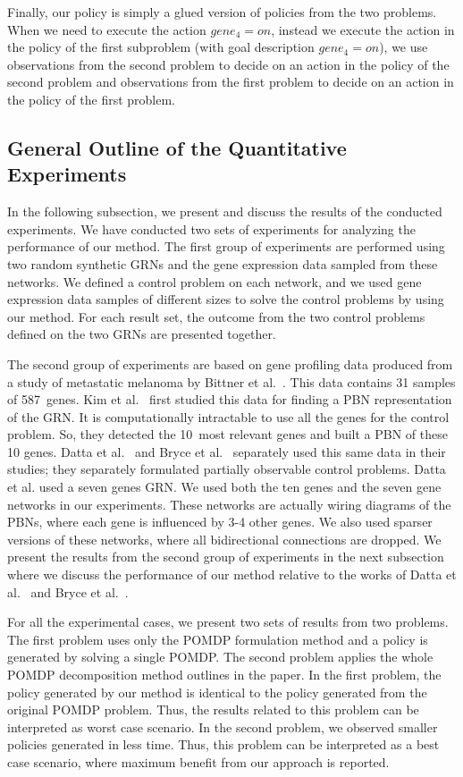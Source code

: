 Finally, our policy is simply a glued version of policies from the two problems. When we need to execute the
action $gene_4 =on$, instead we execute the action in the policy of the first subproblem (with goal
description $gene_4 = on$), we use observations from the second problem to decide on an action in the policy
of the second problem and observations from the first problem to decide on an action in the policy of the
first problem.

\subsection{General Outline of the Quantitative Experiments}
In the following subsection, we present and discuss the results of the conducted experiments. We have conducted two sets
of experiments for analyzing the performance of our method. The first group of experiments are performed
using two random synthetic GRNs and the gene expression data sampled from these networks. We defined a control
problem on each network, and we used gene expression data samples of different sizes to solve the control
problems by using our method. For each result set, the outcome from the two control problems defined on the
two GRNs are presented together.

The second group of experiments are based on gene profiling data produced from a study of metastatic melanoma
by Bittner et al.~\cite{Bittner00}. This data contains 31 samples of 587~genes. Kim et al.~\cite{Kim02} first
studied this data for finding a PBN representation of the GRN. It is computationally intractable to use all
the genes for the control problem. So, they detected the 10~most relevant genes and built a PBN of these 10
genes. Datta et al.~\cite{Datta03} and Bryce et al.~\cite{Bryce07} separately used this same data in their
studies; they separately formulated partially observable control problems. Datta et al. used a seven genes
GRN. We used both the ten genes and the seven gene networks in our experiments. These networks are actually
wiring diagrams of the PBNs, where each gene is influenced by 3-4 other genes. We also used sparser versions
of these networks, where all bidirectional connections are dropped. We present the results from the second
group of experiments in the next subsection where we discuss the performance of our method relative to the
works of Datta et al.~\cite{Datta03} and Bryce et al.~\cite{Bryce07}.

For all the experimental cases, we present two sets of results from two problems. The first problem uses only
the POMDP formulation method and a policy is generated by solving a single POMDP. The second problem applies
the whole POMDP decomposition method outlines in the paper. In the first problem, the policy generated by our
method is identical to the policy generated from the original POMDP problem. Thus, the results related to
this problem can be interpreted as worst case scenario. In the second problem, we observed smaller policies
generated in less time. Thus, this problem can be interpreted as a best case scenario, where maximum benefit
from our approach is reported.

